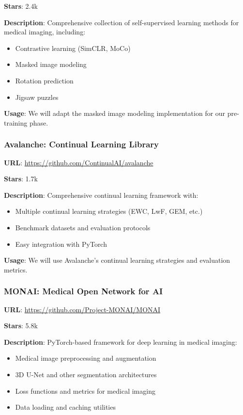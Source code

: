 \documentclass[conference]{IEEEtran}
\begin{document}
\textbf{Stars}: 2.4k

\textbf{Description}: Comprehensive collection of self-supervised learning methods for medical imaging, including:
\begin{itemize}
    \item Contrastive learning (SimCLR, MoCo)
    \item Masked image modeling
    \item Rotation prediction
    \item Jigsaw puzzles
\end{itemize}

\textbf{Usage}: We will adapt the masked image modeling implementation for our pre-training phase.

\subsubsection{Avalanche: Continual Learning Library}

\textbf{URL}: \url{https://github.com/ContinualAI/avalanche}

\textbf{Stars}: 1.7k

\textbf{Description}: Comprehensive continual learning framework with:
\begin{itemize}
    \item Multiple continual learning strategies (EWC, LwF, GEM, etc.)
    \item Benchmark datasets and evaluation protocols
    \item Easy integration with PyTorch
\end{itemize}

\textbf{Usage}: We will use Avalanche's continual learning strategies and evaluation metrics.

\subsubsection{MONAI: Medical Open Network for AI}

\textbf{URL}: \url{https://github.com/Project-MONAI/MONAI}

\textbf{Stars}: 5.8k

\textbf{Description}: PyTorch-based framework for deep learning in medical imaging:
\begin{itemize}
    \item Medical image preprocessing and augmentation
    \item 3D U-Net and other segmentation architectures
    \item Loss functions and metrics for medical imaging
    \item Data loading and caching utilities
\end{itemize}
\end{document}
